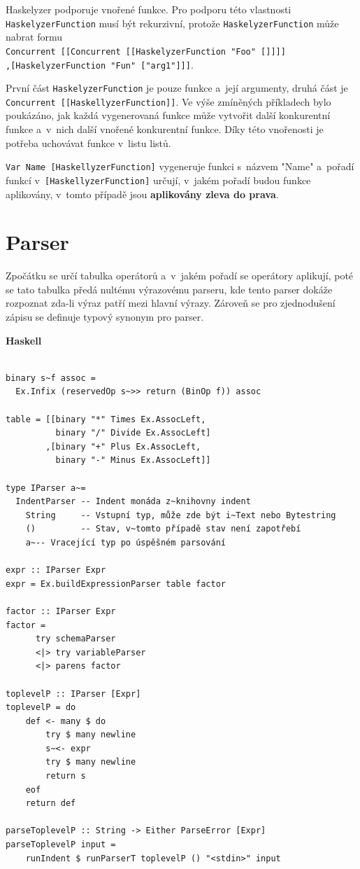 \documentclass[male, czech]{kithesis}
\newcommand{\haskellInline}[1]{\colorbox{gray!10}{\texttt{#1}}}
\begin{document}
Haskelyzer podporuje vnořené funkce. 
Pro podporu této vlastnosti \haskellInline{HaskelyzerFunction} musí být rekurzivní, 
protože \haskellInline{HaskelyzerFunction} může nabrat formu 
\\
\haskellInline{Concurrent [[Concurrent [[HaskelyzerFunction "Foo" []]]]}
\\
\haskellInline{,[HaskelyzerFunction "Fun" ["arg1"]]]}.

První část \haskellInline{HaskelyzerFunction} je pouze funkce
a~její argumenty, 
druhá část je \\
\haskellInline{Concurrent [[HaskellyzerFunction]]}.
Ve výše zmíněných příkladech bylo poukázáno, 
jak každá vygenerovaná funkce může vytvořit 
další konkurentní funkce a~v~nich další vnořené konkurentní funkce. 
Díky této vnořenosti 
je potřeba uchovávat funkce v~listu listů.

\haskellInline{Var Name [HaskellyzerFunction]} vygeneruje funkci s~názvem "Name"
a~pořadí funkcí v~\haskellInline{[HaskellyzerFunction]} určují, 
v~jakém pořadí budou funkce aplikovány,
v~tomto případě jsou \textbf{aplikovány zleva do prava}.

\section{Parser}

Zpočátku se určí tabulka operátorů
a~v~jakém pořadí se operátory aplikují, 
poté se tato tabulka předá nultému výrazovému parseru, 
kde tento parser dokáže rozpoznat zda-li výraz patří mezi
hlavní výrazy. 
Zároveň se pro zjednodušení zápisu se definuje typový 
synonym pro parser.

\textbf{Haskell}
\begin{verbatim}

binary s~f assoc = 
  Ex.Infix (reservedOp s~>> return (BinOp f)) assoc

table = [[binary "*" Times Ex.AssocLeft,
          binary "/" Divide Ex.AssocLeft]
        ,[binary "+" Plus Ex.AssocLeft,
          binary "-" Minus Ex.AssocLeft]]

type IParser a~= 
  IndentParser -- Indent monáda z~knihovny indent
    String     -- Vstupní typ, může zde být i~Text nebo Bytestring
    ()         -- Stav, v~tomto případě stav není zapotřebí
    a~-- Vracející typ po úspěšném parsování

expr :: IParser Expr
expr = Ex.buildExpressionParser table factor

factor :: IParser Expr
factor = 
      try schemaParser 
      <|> try variableParser
      <|> parens factor 

toplevelP :: IParser [Expr]
toplevelP = do 
    def <- many $ do 
        try $ many newline
        s~<- expr 
        try $ many newline
        return s
    eof
    return def

parseToplevelP :: String -> Either ParseError [Expr]
parseToplevelP input = 
    runIndent $ runParserT toplevelP () "<stdin>" input

\end{verbatim}
\end{document}
